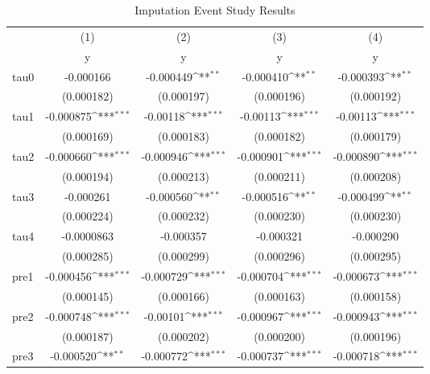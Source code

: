 \begin{table}[htbp]\centering
\def\sym#1{\ifmmode^{#1}\else\(^{#1}\)\fi}
\caption{Imputation Event Study Results}
\begin{tabular}{l*{4}{c}}
\hline\hline
            &\multicolumn{1}{c}{(1)}&\multicolumn{1}{c}{(2)}&\multicolumn{1}{c}{(3)}&\multicolumn{1}{c}{(4)}\\
            &\multicolumn{1}{c}{y}&\multicolumn{1}{c}{y}&\multicolumn{1}{c}{y}&\multicolumn{1}{c}{y}\\
\hline
tau0        &   -0.000166         &   -0.000449\sym{**} &   -0.000410\sym{**} &   -0.000393\sym{**} \\
            &  (0.000182)         &  (0.000197)         &  (0.000196)         &  (0.000192)         \\
[1em]
tau1        &   -0.000875\sym{***}&    -0.00118\sym{***}&    -0.00113\sym{***}&    -0.00113\sym{***}\\
            &  (0.000169)         &  (0.000183)         &  (0.000182)         &  (0.000179)         \\
[1em]
tau2        &   -0.000660\sym{***}&   -0.000946\sym{***}&   -0.000901\sym{***}&   -0.000890\sym{***}\\
            &  (0.000194)         &  (0.000213)         &  (0.000211)         &  (0.000208)         \\
[1em]
tau3        &   -0.000261         &   -0.000560\sym{**} &   -0.000516\sym{**} &   -0.000499\sym{**} \\
            &  (0.000224)         &  (0.000232)         &  (0.000230)         &  (0.000230)         \\
[1em]
tau4        &  -0.0000863         &   -0.000357         &   -0.000321         &   -0.000290         \\
            &  (0.000285)         &  (0.000299)         &  (0.000296)         &  (0.000295)         \\
[1em]
pre1        &   -0.000456\sym{***}&   -0.000729\sym{***}&   -0.000704\sym{***}&   -0.000673\sym{***}\\
            &  (0.000145)         &  (0.000166)         &  (0.000163)         &  (0.000158)         \\
[1em]
pre2        &   -0.000748\sym{***}&    -0.00101\sym{***}&   -0.000967\sym{***}&   -0.000943\sym{***}\\
            &  (0.000187)         &  (0.000202)         &  (0.000200)         &  (0.000196)         \\
[1em]
pre3        &   -0.000520\sym{**} &   -0.000772\sym{***}&   -0.000737\sym{***}&   -0.000718\sym{***}\\

\end{tabular}
\end{table}
